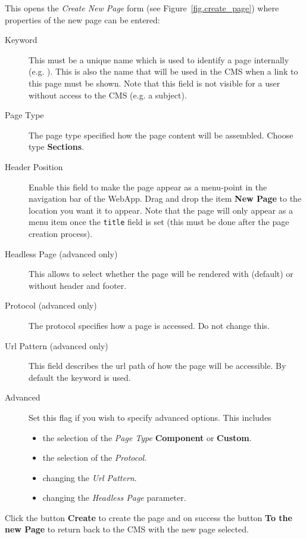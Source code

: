 \documentclass[a4paper,oneside]{book}
\begin{document}
This opens the \emph{Create New Page} form (see Figure~\ref{fig.create_page}) where properties of the new page can be entered:
\begin{description}
    \item[Keyword]
        This must be a unique name which is used to identify a page internally (e.g. ).
        This is also the name that will be used in the CMS when a link to this page must be shown.
        Note that this field is not visible for a user without access to the CMS (e.g. a subject).
    \item[Page Type]
        The page type specified how the page content will be assembled.
        Choose type \textbf{Sections}.
    \item[Header Position]
        Enable this field to make the page appear as a menu-point in the navigation bar of the WebApp.
        Drag and drop the item \textbf{New Page} to the location you want it to appear.
        Note that the page will only appear as a menu item once the \texttt{title} field is set (this must be done after the page creation process).
    \item[Headless Page (advanced only)]
        This allows to select whether the page will be rendered with (default) or without header and footer.
    \item[Protocol (advanced only)]
        The protocol specifies how a page is accessed.
        Do not change this.
    \item[Url Pattern (advanced only)]
        This field describes the url path of how the page will be accessible.
        By default the keyword is used.
    \item[Advanced]
        Set this flag if you wish to specify advanced options.
        This includes
        \begin{itemize}
            \item the selection of the \emph{Page Type} \textbf{Component} or \textbf{Custom}.
            \item the selection of the \emph{Protocol}.
            \item changing the \emph{Url Pattern}.
            \item changing the \emph{Headless Page} parameter.
        \end{itemize}
\end{description}

Click the button \textbf{Create} to create the page and on success the button \textbf{To the new Page} to return back to the CMS with the new page selected.
\end{document}
